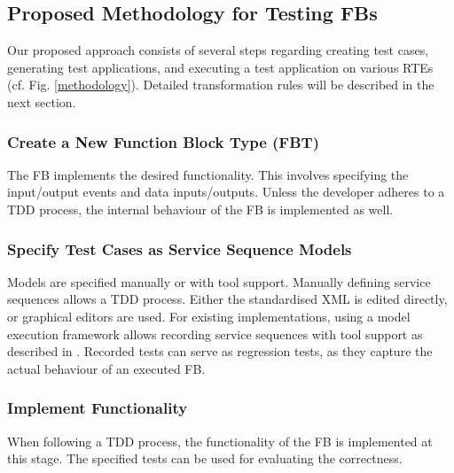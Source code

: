 \begin{bibunit}
\section{Proposed Methodology for Testing FBs}
Our proposed approach consists of several steps regarding creating test cases, generating test applications, and executing a test application on various RTEs (cf. Fig. \ref{methodology}). Detailed transformation rules will be described in the next section.

\subsubsection{Create a New Function Block Type (FBT)} The FB implements the desired functionality. This involves specifying the input/output events and data inputs/outputs. Unless the developer adheres to a TDD process, the internal behaviour of the FB is implemented as well.

\subsubsection{Specify Test Cases as Service Sequence Models} Models are specified manually or with tool support. Manually defining service sequences allows a TDD process. Either the standardised XML is edited directly, or graphical editors are used. For existing implementations, using a model execution framework allows recording service sequences with tool support as described in \cite{wiesmayr2021}. Recorded tests can serve as regression tests, as they capture the actual behaviour of an executed FB.


    \subsubsection{Implement Functionality}
    When following a TDD process, the functionality of the FB is implemented at this stage. The specified tests can be used for evaluating the correctness.
   

\end{bibunit}
